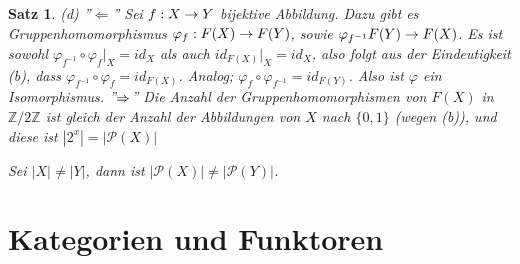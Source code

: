 \documentclass[a4paper,10pt,german]{scrbook}
\theoremstyle{saetze}
\newtheorem{Satz}{Satz}
\theoremstyle{definitionen}
\begin{document}
\begin{Satz}
{\item[(d)] ''$\Leftarrow$'' Sei $f:X \rightarrow Y$ bijektive Abbildung. Dazu gibt
es Gruppenhomomorphismus $\varphi_f: F(X) \rightarrow F(Y)$, sowie
$\varphi_{f^{-1}} F(Y) \rightarrow F(X)$.  Es ist sowohl
$\varphi_{f^{-1}} \circ \varphi_{f}
|_X = id_X$ als auch $id_{F(X)}|_X = id_X$, also folgt aus der Eindeutigkeit (b), dass $\varphi_{f^{-1}} \circ \varphi_{f} = id_{F(X)}$. Analog;
$\varphi_f \circ \varphi_{f^{-1}} = id_{F(Y)}$. Also ist $\varphi$ ein Isomorphismus.
\newline ''$\Rightarrow$'' Die Anzahl der
Gruppenhomomorphismen von $F(X)$ in $\mathbb{Z}/2\mathbb{Z}$ ist
gleich der Anzahl der Abbildungen von $X$ nach
$\{0,1\}$ (wegen (b)), und diese ist $|2^x| = |\mathcal P(X)|$

Sei $|X| \neq |Y|$, dann ist $|\mathcal P(X)|\ne |\mathcal P(Y)|$. 
}
\end{Satz}

\section{Kategorien und Funktoren}
\end{document}
